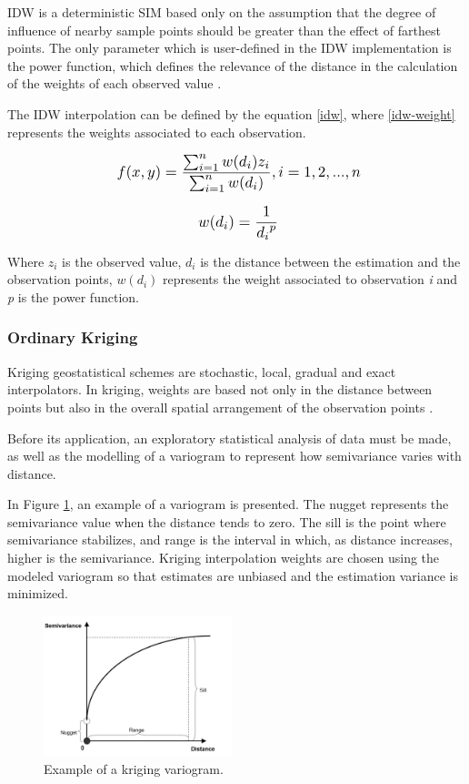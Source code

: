 IDW is a deterministic SIM based only on the assumption that the degree of influence of nearby sample points should be greater than the effect of farthest points. The only parameter which is user-defined in the IDW implementation is the power function, which defines the relevance of the distance in the calculation of the weights of each observed value \cite{Mesquita2009}.

The IDW interpolation can be defined by the equation \eqref{idw}, where \eqref{idw-weight} represents the weights associated to each observation.

\begin{equation} 
\label{idw}
\scalebox{1.2}{ $ f(x, y) = \dfrac{\sum_{i=1}^{n} w(d_i)z_i}{\sum_{i=1}^{n} w(d_i)}, i = 1, 2, ..., n$}
\end{equation}

\begin{equation} 
\label{idw-weight}
\scalebox{1.2}{ $w(d_i)= \dfrac{1}{{d_i}^{p}}$}
\end{equation}

Where $z_i$ is the observed value, $d_i$ is the distance between the estimation and the observation points, $w(d_i)$ represents the weight associated to observation \textit{i} and \textit{p} is the power function.

\subsubsection{Ordinary Kriging}

Kriging geostatistical schemes are stochastic, local, gradual and exact interpolators. In kriging, weights are based not only in the distance between points but also in the overall spatial arrangement of the observation points \cite{Mesquita2009}.

Before its application, an exploratory statistical analysis of data must be made, as well as the modelling of a variogram to represent how semivariance varies with distance.

In Figure \ref{fig:variogram}, an example of a variogram is presented. The nugget represents the semivariance value when the distance tends to zero. The sill is the point where semivariance stabilizes, and range is the interval in which, as distance increases, higher is the semivariance. Kriging interpolation weights are chosen using the modeled variogram so that estimates are unbiased and the estimation variance is minimized.

\begin{figure}[ht]
\centering
\includegraphics[width=0.49\textwidth]{./Images/variogram.png}
\caption{Example of a kriging variogram.}
\label{fig:variogram}
\end{figure}


